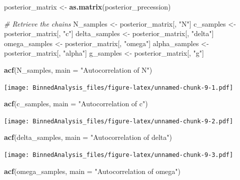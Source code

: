 \documentclass[
]{article}
\newenvironment{Shaded}{\begin{snugshade}}{\end{snugshade}}
\newcommand{\AttributeTok}[1]{\textcolor[rgb]{0.13,0.29,0.53}{#1}}
\newcommand{\CommentTok}[1]{\textcolor[rgb]{0.56,0.35,0.01}{\textit{#1}}}
\newcommand{\FunctionTok}[1]{\textcolor[rgb]{0.13,0.29,0.53}{\textbf{#1}}}
\newcommand{\NormalTok}[1]{#1}
\newcommand{\OtherTok}[1]{\textcolor[rgb]{0.56,0.35,0.01}{#1}}
\newcommand{\StringTok}[1]{\textcolor[rgb]{0.31,0.60,0.02}{#1}}
\begin{document}
\begin{Shaded}
\begin{Highlighting}[]
\NormalTok{posterior\_matrix }\OtherTok{\textless{}{-}} \FunctionTok{as.matrix}\NormalTok{(posterior\_precession)}

\CommentTok{\# Retrieve the chains}
\NormalTok{N\_samples    }\OtherTok{\textless{}{-}}\NormalTok{ posterior\_matrix[, }\StringTok{"N"}\NormalTok{]}
\NormalTok{c\_samples    }\OtherTok{\textless{}{-}}\NormalTok{ posterior\_matrix[, }\StringTok{"c"}\NormalTok{]}
\NormalTok{delta\_samples }\OtherTok{\textless{}{-}}\NormalTok{ posterior\_matrix[, }\StringTok{"delta"}\NormalTok{]}
\NormalTok{omega\_samples }\OtherTok{\textless{}{-}}\NormalTok{ posterior\_matrix[, }\StringTok{"omega"}\NormalTok{]}
\NormalTok{alpha\_samples }\OtherTok{\textless{}{-}}\NormalTok{ posterior\_matrix[, }\StringTok{"alpha"}\NormalTok{]}
\NormalTok{g\_samples }\OtherTok{\textless{}{-}}\NormalTok{ posterior\_matrix[, }\StringTok{"g"}\NormalTok{]}


\FunctionTok{acf}\NormalTok{(N\_samples, }\AttributeTok{main =} \StringTok{"Autocorrelation of N"}\NormalTok{)}
\end{Highlighting}
\end{Shaded}

\texttt{[image: BinnedAnalysis\_files/figure-latex/unnamed-chunk-9-1.pdf]}

\begin{Shaded}
\begin{Highlighting}[]
\FunctionTok{acf}\NormalTok{(c\_samples, }\AttributeTok{main =} \StringTok{"Autocorrelation of c"}\NormalTok{)}
\end{Highlighting}
\end{Shaded}

\texttt{[image: BinnedAnalysis\_files/figure-latex/unnamed-chunk-9-2.pdf]}

\begin{Shaded}
\begin{Highlighting}[]
\FunctionTok{acf}\NormalTok{(delta\_samples, }\AttributeTok{main =} \StringTok{"Autocorrelation of delta"}\NormalTok{)}
\end{Highlighting}
\end{Shaded}

\texttt{[image: BinnedAnalysis\_files/figure-latex/unnamed-chunk-9-3.pdf]}

\begin{Shaded}
\begin{Highlighting}[]
\FunctionTok{acf}\NormalTok{(omega\_samples, }\AttributeTok{main =} \StringTok{"Autocorrelation of omega"}\NormalTok{)}
\end{Highlighting}
\end{Shaded}
\end{document}
